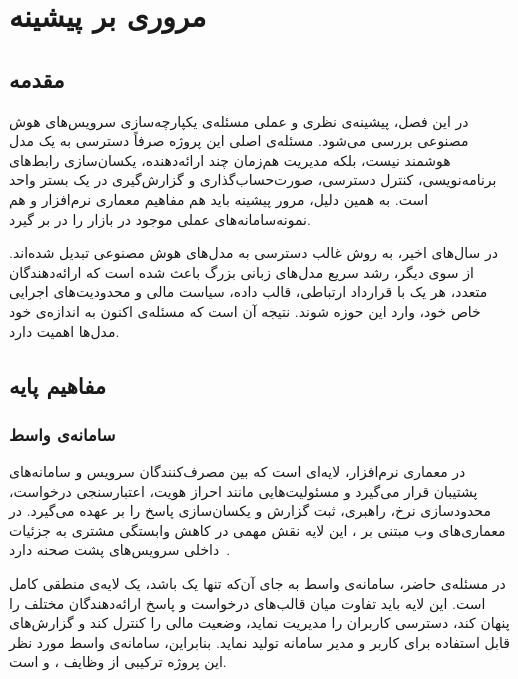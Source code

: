 \chapter{مروری بر پیشینه}
\label{ch:related}

\section{مقدمه}

در این فصل، پیشینه‌ی نظری و عملی مسئله‌ی یکپارچه‌سازی سرویس‌های هوش
مصنوعی بررسی می‌شود. مسئله‌ی اصلی این پروژه صرفاً دسترسی به یک مدل
هوشمند نیست، بلکه مدیریت هم‌زمان چند ارائه‌دهنده، یکسان‌سازی رابط‌های
برنامه‌نویسی، کنترل دسترسی، صورت‌حساب‌گذاری و گزارش‌گیری در یک بستر واحد
است. به همین دلیل، مرور پیشینه باید هم مفاهیم معماری نرم‌افزار و هم
نمونه‌سامانه‌های عملی موجود در بازار را در بر گیرد.

در سال‌های اخیر،  به روش غالب دسترسی به مدل‌های هوش مصنوعی تبدیل شده‌اند.
از سوی دیگر، رشد سریع مدل‌های زبانی بزرگ باعث شده است که ارائه‌دهندگان
متعدد، هر یک با قرارداد ارتباطی، قالب داده، سیاست مالی و محدودیت‌های
اجرایی خاص خود، وارد این حوزه شوند. نتیجه آن است که مسئله‌ی
 اکنون به اندازه‌ی خود مدل‌ها اهمیت دارد.

\section{مفاهیم پایه}

\subsection{سامانه‌ی واسط }

 در معماری نرم‌افزار، لایه‌ای است که بین
مصرف‌کنندگان سرویس و سامانه‌های پشتیبان قرار می‌گیرد و مسئولیت‌هایی مانند
احراز هویت، اعتبارسنجی درخواست، محدودسازی نرخ، راهبری، ثبت گزارش و
یکسان‌سازی پاسخ را بر عهده می‌گیرد. در معماری‌های وب مبتنی بر
،
این لایه نقش مهمی در کاهش وابستگی مشتری به جزئیات داخلی سرویس‌های پشت
صحنه دارد~\cite{fielding2000}.

در مسئله‌ی حاضر، سامانه‌ی واسط به جای آن‌که تنها یک 
باشد، یک لایه‌ی منطقی کامل است. این لایه باید تفاوت میان قالب‌های
درخواست و پاسخ ارائه‌دهندگان مختلف را پنهان کند، دسترسی کاربران را
مدیریت نماید، وضعیت مالی را کنترل کند و گزارش‌های قابل استفاده برای
کاربر و مدیر سامانه تولید نماید. بنابراین، سامانه‌ی واسط مورد نظر این
پروژه ترکیبی از وظایف ،  و
 است.

